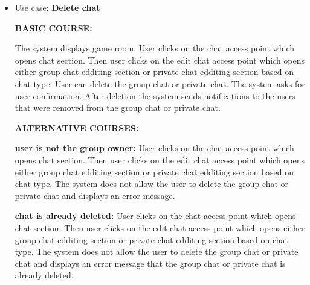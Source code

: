 \documentclass[]{VUMIFTemplateClass}
\begin{document}
\begin{itemize}
    \textbf{changing global chat type in home page is not allowed}
    User clicks on the global chat access point icon but it does not open any menus. System does not allow to change global chat type in home page.

    \item 
    Use case: \textbf{Delete chat}

    \textbf{BASIC COURSE:}

    The system displays game room. User clicks on the chat access point which opens chat section. Then user clicks on the edit chat access point which opens either group chat edditing section or private chat edditing section based on chat type. User can delete the group chat or private chat. The system asks for user confirmation. After deletion the system sends notifications to the users that were removed from the group chat or private chat.

    \textbf{ALTERNATIVE COURSES:}

    \textbf{user is not the group owner:}
    User clicks on the chat access point which opens chat section. Then user clicks on the edit chat access point which opens either group chat edditing section or private chat edditing section based on chat type. The system does not allow the user to delete the group chat or private chat and displays an error message.

    \textbf{chat is already deleted:}
    User clicks on the chat access point which opens chat section. Then user clicks on the edit chat access point which opens either group chat edditing section or private chat edditing section based on chat type. The system does not allow the user to delete the group chat or private chat and displays an error message that the group chat or private chat is already deleted.

\end{itemize}
\end{document}
